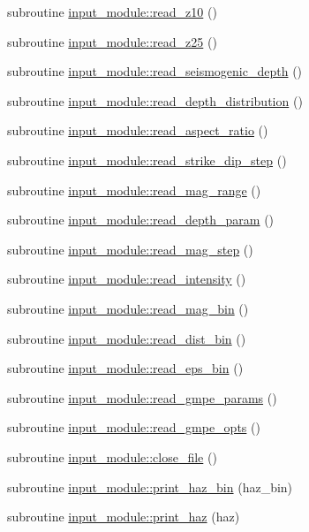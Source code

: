 \begin{DoxyCompactItemize}
\item 
subroutine \hyperlink{namespaceinput__module_a79ff648d45e7ac3f88ed461464c23901}{input\+\_\+module\+::read\+\_\+z10} ()
\item 
subroutine \hyperlink{namespaceinput__module_a37d4fe4627c2f2d2f7063f9df9730476}{input\+\_\+module\+::read\+\_\+z25} ()
\item 
subroutine \hyperlink{namespaceinput__module_a3b50bd9377741e86fbc4f43ec8e5ef93}{input\+\_\+module\+::read\+\_\+seismogenic\+\_\+depth} ()
\item 
subroutine \hyperlink{namespaceinput__module_af139a93b520328955d0ff24a5283a948}{input\+\_\+module\+::read\+\_\+depth\+\_\+distribution} ()
\item 
subroutine \hyperlink{namespaceinput__module_a2b52a667be52963438f117c68ae24bd1}{input\+\_\+module\+::read\+\_\+aspect\+\_\+ratio} ()
\item 
subroutine \hyperlink{namespaceinput__module_a82104204d5b1aff59b087d4b87cf166b}{input\+\_\+module\+::read\+\_\+strike\+\_\+dip\+\_\+step} ()
\item 
subroutine \hyperlink{namespaceinput__module_a9277ed03dfb00814405f98a5b0455d1c}{input\+\_\+module\+::read\+\_\+mag\+\_\+range} ()
\item 
subroutine \hyperlink{namespaceinput__module_a7ce68361e26ec82b49e5313f235dc695}{input\+\_\+module\+::read\+\_\+depth\+\_\+param} ()
\item 
subroutine \hyperlink{namespaceinput__module_a236da7bc51e5b4d79ef626a76b8dbea1}{input\+\_\+module\+::read\+\_\+mag\+\_\+step} ()
\item 
subroutine \hyperlink{namespaceinput__module_acd40b5b88af0a4f619e2054305e670bb}{input\+\_\+module\+::read\+\_\+intensity} ()
\item 
subroutine \hyperlink{namespaceinput__module_a9cf8432b15120af2d78057266ef67ae0}{input\+\_\+module\+::read\+\_\+mag\+\_\+bin} ()
\item 
subroutine \hyperlink{namespaceinput__module_a8205f938072af7f3a84f190cdf9e32b3}{input\+\_\+module\+::read\+\_\+dist\+\_\+bin} ()
\item 
subroutine \hyperlink{namespaceinput__module_a5d16b74f3e1993596b03be49827acd58}{input\+\_\+module\+::read\+\_\+eps\+\_\+bin} ()
\item 
subroutine \hyperlink{namespaceinput__module_a86e724d27e380be85ae46ead8f422ab5}{input\+\_\+module\+::read\+\_\+gmpe\+\_\+params} ()
\item 
subroutine \hyperlink{namespaceinput__module_ae5ed3783a3cd022cd1606bd280ca816d}{input\+\_\+module\+::read\+\_\+gmpe\+\_\+opts} ()
\item 
subroutine \hyperlink{namespaceinput__module_a196ab42a030cc2c0efcd2bd463afa3f8}{input\+\_\+module\+::close\+\_\+file} ()
\item 
subroutine \hyperlink{namespaceinput__module_ab34e9ffe1c6528cc2b5dc30c18126c11}{input\+\_\+module\+::print\+\_\+haz\+\_\+bin} (haz\+\_\+bin)
\item 
subroutine \hyperlink{namespaceinput__module_a8dca2c193a492040a82753e06385b154}{input\+\_\+module\+::print\+\_\+haz} (haz)
\end{DoxyCompactItemize}
